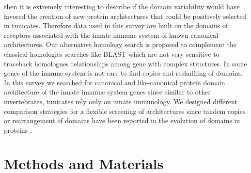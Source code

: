 \documentclass[11pt]{article}
\begin{document}
then it is extremely interesting to describe if the domain variability would 
have favored the creation of new protein architectures that could be positively 
selected in tunicates\cite{paalsson2007building}. Therefore data used in this 
survey are built on the domains of receptors associated with the innate 
immune system of known canonical architectures. Our alternative  homology 
search is 
proposed to complement the classical homologies searches like BLAST which are 
not very sensitive to traceback homologues relationships among gene with complex 
structures\cite{Buckley64}. In some genes of the inmune system is not rare to 
find copies and reshuffling of domains. In this survey we searched for canonical 
and like-canonical protein domain architecture of the innate immune system genes 
since similar to other invertebrates, tunicates rely only on innate 
immunology\cite{franchi2017}. We designed different comparison strategies for a 
flexible screening of architectures since tandem copies or rearrangement of 
domains have been reported in the evolution of domains in proteins 
\cite{Forslund2012}.

\section*{Methods and Materials}
\end{document}
